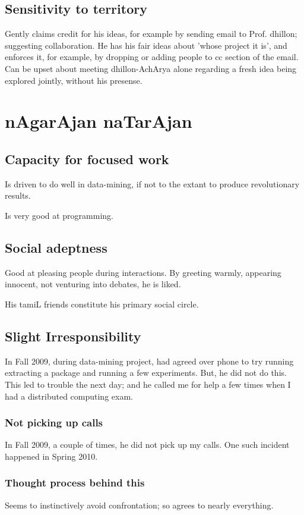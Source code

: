 \documentclass[oneside, article]{memoir}
\begin{document}
\section{Sensitivity to territory}
Gently claims credit for his ideas, for example by sending email to Prof. dhillon; suggesting collaboration. He has his fair ideas about 'whose project it is', and enforces it, for example, by dropping or adding people to cc section of the email. Can be upset about meeting dhillon-AchArya alone regarding a fresh idea being explored jointly, without his presense.

\chapter{nAgarAjan naTarAjan}
\section{Capacity for focused work}
Is driven to do well in data-mining, if not to the extant to produce revolutionary results.

Is very good at programming.

\section{Social adeptness}
Good at pleasing people during interactions. By greeting warmly, appearing innocent, not venturing into debates, he is liked.

His tamiL friends constitute his primary social circle.

\section{Slight Irresponsibility}
In Fall 2009, during data-mining project, had agreed over phone to try running extracting a package and running a few experiments. But, he did not do this. This led to trouble the next day; and he called me for help a few times when I had a distributed computing exam.

\subsection{Not picking up calls}
In Fall 2009, a couple of times, he did not pick up my calls. One such incident happened in Spring 2010.

\subsection{Thought process behind this}
Seems to instinctively avoid confrontation; so agrees to nearly everything.
\end{document}
